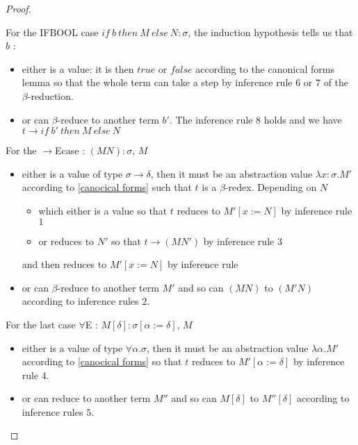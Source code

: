 \documentclass{article}
\begin{document}
\begin{proof}
\begin{itemize}
        \end{itemize}
        \par
        For the IFBOOL case $if \ b \ then \ M \ else \ N : \sigma$, the induction hypothesis tells us that $b$ :
        \begin{itemize}
            \item either is a value: it is then $true$ or $false$ according to the canonical forms lemma so that the whole term can take a step by inference rule $6$ or $7$ of the $\beta$-reduction.
            \item or can $\beta$-reduce to another term $b'$. The inference rule $8$ holds and we have $t\rightarrow if \ b' \ then \ M \ else \ N$
        \end{itemize}
        \par For the $\rightarrow$Ecase : $(M N):\sigma$, $M$
        \begin{itemize}
            \item either is a value of type $\sigma\rightarrow\delta$, then it must be an abstraction value $\lambda x : \sigma.M'$ according to 
            \ref{canocical forms} such that $t$ is a $\beta$-redex. Depending on $N$
            \begin{itemize}
                \item which either is a value so that $t$ reduces to $M'[x:=N]$ by inference rule $1$
                \item or reduces to $N'$ so that $t\rightarrow(M N')$ by inference rule $3$
            \end{itemize} and then reduces to $M'[x:=N]$ by inference rule 
            \item or can $\beta$-reduce to another term $M'$ and so can $(M N)$ to $(M' N)$ according to inference rules $2$.
        \end{itemize}
        \par For the last case $\forall$E : $M[\delta]:\sigma[\alpha:=\delta]$, $M$
        \begin{itemize}
            \item either is a value of type $\forall\alpha.\sigma$, then it must be an abstraction value $\lambda \alpha .M'$ according to 
            \ref{canocical forms}  so that $t$ reduces to $M'[\alpha:=\delta]$ by inference rule $4$.
            \item or can reduce to another term $M''$ and so can $M[\delta]$ to $M''[\delta]$ according to inference rules $5$.
        \end{itemize}
        
    \end{proof}
\end{document}
